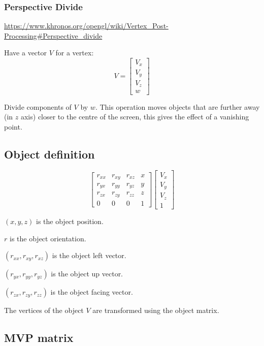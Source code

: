 \documentclass[a4paper]{article}
\begin{document}
\subsubsection{Perspective Divide}

\url{https://www.khronos.org/opengl/wiki/Vertex_Post-Processing#Perspective_divide}

Have a vector $V$ for a vertex:
\[
  V =
  \left [
    \begin{array}{c}
      V_{x} \\
      V_{y} \\
      V_{z} \\
      w
    \end{array}
  \right ]
\]

Divide components of $V$ by $w$. This operation moves objects that are further
away (in $z$ axis) closer to the centre of the screen, this gives the effect of
a vanishing point.

\subsection{Object definition}

\[
  \left [
    \begin{array}{cccc}
      r_{xx}  & r_{xy}  & r_{xz}  & x \\
      r_{yx}  & r_{yy}  & r_{yz}  & y \\
      r_{zx}  & r_{zy}  & r_{zz}  & z \\
      0       & 0       & 0       & 1
    \end{array}
  \right ]
  \left [
    \begin{array}{c}
      V_{x} \\
      V_{y} \\
      V_{z} \\
      1
    \end{array}
  \right ]
\]

$(x, y, z)$ is the object position.

$r$ is the object orientation.

$(r_{xx}, r_{xy}, r_{xz})$ is the object left vector.

$(r_{yx}, r_{yy}, r_{yz})$ is the object up vector.

$(r_{zx}, r_{zy}, r_{zz})$ is the object facing vector.

The vertices of the object $V$ are transformed using the object matrix.

\subsection{MVP matrix}
\end{document}
